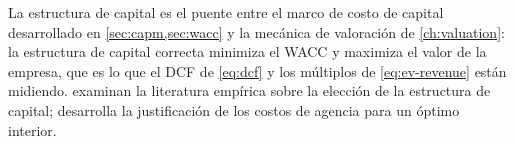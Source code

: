 La estructura de capital es el puente entre el marco de costo de capital desarrollado en
\cref{sec:capm,sec:wacc} y la mecánica de valoración de \cref{ch:valuation}: la estructura de
capital correcta minimiza el WACC y maximiza el valor de la empresa, que es lo que el DCF de
\cref{eq:dcf} y los múltiplos de \cref{eq:ev-revenue} están midiendo.
\textcite{brealey2020} examinan la literatura empírica sobre la elección de la estructura de capital;
\textcite{jensen1976agency} desarrolla la justificación de los costos de agencia para un óptimo
interior.
